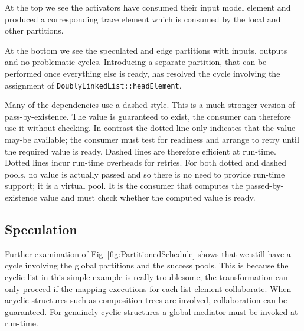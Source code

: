 \documentclass{llncs}
\begin{document}
At the top we see the activators have consumed their input model element and produced a corresponding trace element which is consumed by the local and other partitions.

At the bottom we see the speculated and edge partitions with inputs, outputs and no problematic cycles. Introducing a separate partition, that can be performed once everything else is ready, has resolved the cycle involving the assignment of \verb$DoublyLinkedList::headElement$.

Many of the dependencies use a dashed style. This is a much stronger version of pass-by-existence. The value is guaranteed to exist, the consumer can therefore use it without checking. In contrast the dotted line only indicates that the value may-be available; the consumer must test for readiness and arrange to retry until the required value is ready. Dashed lines are therefore efficient at run-time. Dotted lines incur run-time overheads for retries. For both dotted and dashed pools, no value is actually passed and so there is no need to provide run-time support; it is a virtual pool. It is the consumer that computes the passed-by-existence value and must check whether the computed value is ready.

\subsection{Speculation}

Further examination of Fig~\ref{fig:PartitionedSchedule} shows that we still have a cycle involving the global partitions and the success pools. This is because the cyclic list in this simple example is really troublesome; the transformation can only proceed if the mapping executions for each list element collaborate. When acyclic structures such as composition trees are involved, collaboration can be guaranteed. For genuinely cyclic structures a global mediator must be invoked at run-time.


\end{document}
